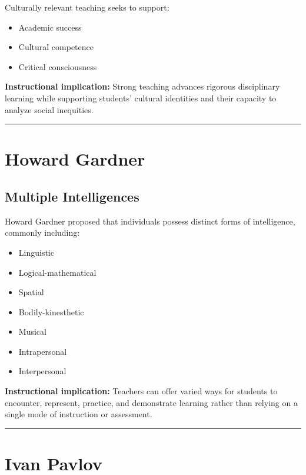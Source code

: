 \documentclass[
  letterpaper,
  DIV=11,
  numbers=noendperiod]{scrartcl}
\providecommand{\tightlist}{%
  \setlength{\itemsep}{0pt}\setlength{\parskip}{0pt}}\usepackage{longtable,booktabs,array}
\begin{document}
Culturally relevant teaching seeks to support:

\begin{itemize}
\tightlist
\item
  Academic success
\item
  Cultural competence
\item
  Critical consciousness
\end{itemize}

\textbf{Instructional implication:} Strong teaching advances rigorous
disciplinary learning while supporting students' cultural identities and
their capacity to analyze social inequities.

\begin{center}\rule{0.5\linewidth}{0.5pt}\end{center}

\section{Howard Gardner}\label{howard-gardner}

\subsection{Multiple Intelligences}\label{multiple-intelligences}

Howard Gardner proposed that individuals possess distinct forms of
intelligence, commonly including:

\begin{itemize}
\tightlist
\item
  Linguistic
\item
  Logical-mathematical
\item
  Spatial
\item
  Bodily-kinesthetic
\item
  Musical
\item
  Intrapersonal
\item
  Interpersonal
\end{itemize}

\textbf{Instructional implication:} Teachers can offer varied ways for
students to encounter, represent, practice, and demonstrate learning
rather than relying on a single mode of instruction or assessment.

\begin{center}\rule{0.5\linewidth}{0.5pt}\end{center}

\section{Ivan Pavlov}\label{ivan-pavlov}
\end{document}
